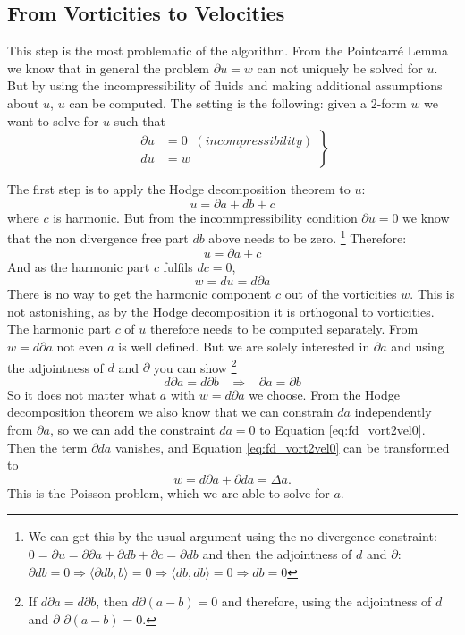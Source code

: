 \subsection{From Vorticities to Velocities}
\label{subsec:fd_vort2vel}
This step is the most problematic of the algorithm. From the Pointcarr\'e Lemma we know that   in general  the problem $\partial u = w$ can not uniquely be solved for $u$. But by using the incompressibility of fluids and making additional assumptions about $u$, $u$ can be computed. The setting is the following: given a $2$-form $w$ we want to solve for $u$ such that
\begin{equation*}\left.\begin{aligned}\partial u &= 0 \;\; (incompressibility) \\ 
du &= w \end{aligned}\right\}\end{equation*}

The first step is to apply the Hodge decomposition theorem to $u$:
\[u = \partial a + db + c \]
where $c$ is harmonic. But from the incommpressibility condition $\partial u = 0$ we know that the non divergence free part $db$ above needs to be zero.\nobreak
%
\footnote{ We can get this by the usual argument using the no divergence constraint: $0 = \partial u = \partial \partial a + \partial db + \partial c = \partial d b$ and then the adjointness of $d$ and $\partial$: $\partial d b = 0 \Rightarrow \langle \partial d b , b \rangle = 0 \Rightarrow \langle db, db \rangle = 0 \Rightarrow db = 0 $}
%
Therefore: 
\[u = \partial a + c\]
And as the harmonic part $c$ fulfils $dc = 0$,
\begin{equation} w = du = d\partial a \label{eq:fd_vort2vel0}\end{equation}
There is no way to get the harmonic component $c$ out of the vorticities $w$. This is not astonishing, as by the Hodge decomposition it is orthogonal to vorticities. The harmonic part $c$ of $u$ therefore needs to be computed separately. From $w = d \partial a$ not even $a$ is well defined. But we are solely interested in $\partial a$ and using the adjointness of $d$ and $\partial$ you can show 
%
\footnote{If $ d \partial a = d \partial b$, then $d \partial (a- b) = 0$ and therefore, using the adjointness of $d$ and $\partial$ $\partial (a-b) = 0.$}
%
$$d \partial a = d \partial b \;\;\;\Rightarrow\;\;\; \partial a = \partial b$$
%
So it does not matter what $a$ with $w = d \partial a$ we choose. From the Hodge decomposition theorem we also know that we can constrain $da$ independently from $\partial a$, so we can add the constraint $da = 0$ to Equation \ref{eq:fd_vort2vel0}. Then the term $\partial d a$ vanishes, and Equation \ref{eq:fd_vort2vel0} can be transformed to
\begin{equation} w = d\partial a + \partial d a = \Delta a .\label{eq:fd_vort2vel}\end{equation}
This is the Poisson problem, which we are able to solve for $a$.

